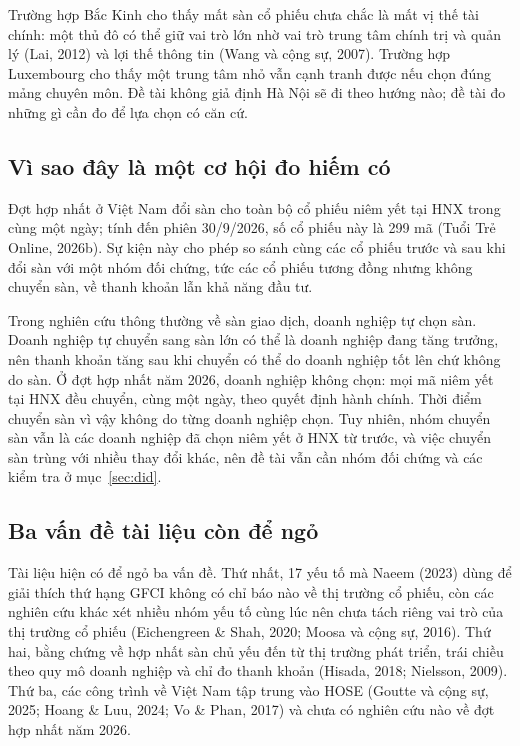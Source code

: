 Trường hợp Bắc Kinh cho thấy mất sàn cổ phiếu chưa chắc là mất vị thế tài chính: một thủ đô có thể giữ vai trò lớn nhờ vai trò trung tâm chính trị và quản lý (Lai, 2012) và lợi thế thông tin (Wang và cộng sự, 2007). Trường hợp Luxembourg cho thấy một trung tâm nhỏ vẫn cạnh tranh được nếu chọn đúng mảng chuyên môn. Đề tài không giả định Hà Nội sẽ đi theo hướng nào; đề tài đo những gì cần đo để lựa chọn có căn cứ.

\subsection*{Vì sao đây là một cơ hội đo hiếm có}

Đợt hợp nhất ở Việt Nam đổi sàn cho toàn bộ cổ phiếu niêm yết tại HNX trong cùng một ngày; tính đến phiên 30/9/2026, số cổ phiếu này là 299 mã (Tuổi Trẻ Online, 2026b). Sự kiện này cho phép so sánh cùng các cổ phiếu trước và sau khi đổi sàn với một nhóm đối chứng, tức các cổ phiếu tương đồng nhưng không chuyển sàn, về thanh khoản lẫn khả năng đầu tư.

Trong nghiên cứu thông thường về sàn giao dịch, doanh nghiệp tự chọn sàn. Doanh nghiệp tự chuyển sang sàn lớn có thể là doanh nghiệp đang tăng trưởng, nên thanh khoản tăng sau khi chuyển có thể do doanh nghiệp tốt lên chứ không do sàn. Ở đợt hợp nhất năm 2026, doanh nghiệp không chọn: mọi mã niêm yết tại HNX đều chuyển, cùng một ngày, theo quyết định hành chính. Thời điểm chuyển sàn vì vậy không do từng doanh nghiệp chọn. Tuy nhiên, nhóm chuyển sàn vẫn là các doanh nghiệp đã chọn niêm yết ở HNX từ trước, và việc chuyển sàn trùng với nhiều thay đổi khác, nên đề tài vẫn cần nhóm đối chứng và các kiểm tra ở mục~\ref{sec:did}.

\subsection*{Ba vấn đề tài liệu còn để ngỏ}

Tài liệu hiện có để ngỏ ba vấn đề. Thứ nhất, 17 yếu tố mà Naeem (2023) dùng để giải thích thứ hạng GFCI không có chỉ báo nào về thị trường cổ phiếu, còn các nghiên cứu khác xét nhiều nhóm yếu tố cùng lúc nên chưa tách riêng vai trò của thị trường cổ phiếu (Eichengreen \& Shah, 2020; Moosa và cộng sự, 2016). Thứ hai, bằng chứng về hợp nhất sàn chủ yếu đến từ thị trường phát triển, trái chiều theo quy mô doanh nghiệp và chỉ đo thanh khoản (Hisada, 2018; Nielsson, 2009). Thứ ba, các công trình về Việt Nam tập trung vào HOSE (Goutte và cộng sự, 2025; Hoang \& Luu, 2024; Vo \& Phan, 2017) và chưa có nghiên cứu nào về đợt hợp nhất năm 2026.


